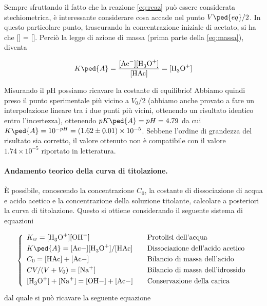 Sempre sfruttando il fatto che la reazione \eqref{eq:reaz} può essere considerata stechiometrica,
è interessante considerare cosa accade nel punto $V\ped{eq}/2$. In questo particolare punto,
trascurando la concentrazione iniziale di acetato, si ha che [] = [].
Perciò la legge di azione di massa (prima parte della \eqref{eq:massa}), diventa 

\begin{equation}
    K\ped{A} = \frac{[\ce{Ac-}][\ce{H3O+}]}{[\ce{HAc}]} = [\ce{H3O+}]
\end{equation}

Misurando il pH possiamo ricavare la costante di equilibrio! Abbiamo quindi preso il punto sperimentale
più vicino a $V_0/2$ (abbiamo anche provato a fare un interpolazione lineare tra i due punti più
vicini, ottenendo un risultato identico entro l'incertezza), ottenendo $pK\ped{A} = pH = 4.79$ da cui
$K\ped{A} = 10^{-pH} = (1.62 \pm 0.01) \times 10^{-5}$. Sebbene l'ordine di grandezza del risultato sia corretto, il valore ottenuto non è compatibile con il valore $1.74 \times 10^{-5}$ riportato in letteratura.

\paragraph{Andamento teorico della curva di titolazione.}

È possibile, conoscendo la concentrazione $C_0$, la costante di dissociazione di
acqua e acido acetico e la concentrazione della soluzione titolante,
calcolare a posteriori la curva di titolazione.
Questo si ottiene considerando il seguente sistema di equazioni

\begin{equation}
    \left\{
    \begin{array}{l @\qquad l} \smallskip
        K_w = [\ce{H3O+}][\ce{OH-}] & \text{Protolisi dell'acqua} \\ \smallskip
        K\ped{A} = [\ce{Ac-]}[\ce{H3O+}]/[\ce{HAc}] & \text{Dissociazione dell'acido acetico} \\ \smallskip
        C_0 = \ce{[HAc] + [Ac-]} & \text{Bilancio di massa dell'acido} \\ \smallskip
        CV/(V + V_0) = [\ce{Na+}] & \text{Bilancio di massa dell'idrossido} \\ \smallskip
        \ce{[H3O+] + [Na+] = [OH-] + [Ac-]} & \text{Conservazione della carica} \\
    \end{array}
    \right.
    \label{eq:sistemone}
\end{equation}
%
dal quale si può ricavare la seguente equazione

